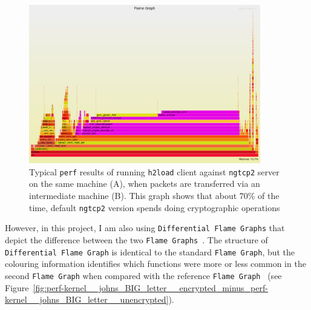 \documentclass[12pt,a4paper,twoside,openright]{report}
\begin{document}
    \begin{figure}[H]
    \centering
    \includegraphics[width=0.9\textwidth]{figs/perf_results_of_h2load.png}
    \caption[Typical \texttt{perf} results of running \texttt{h2load} client against \texttt{ngtcp2} server on the same machine (A), when packets are transferred via an intermediate machine (B)]{Typical \texttt{perf} results of running \texttt{h2load} client against \texttt{ngtcp2} server on the same machine (A), when packets are transferred via an intermediate machine (B). This graph shows that about 70\% of the time, default \texttt{ngtcp2} version spends doing cryptographic operations} 
    \label{fig:perf_results_of_h2load}
    \end{figure}


However, in this project, I am also using \texttt{Differential Flame Graphs} that depict the difference between the two \texttt{Flame Graphs}~\cite{Differential_Flame_Graphs}.
The structure of \texttt{Differential Flame Graph} is identical to the standard \texttt{Flame Graph}, but the colouring information identifies which functions were more or less common in the second \texttt{Flame Graph} when compared with the reference \texttt{Flame Graph}~\cite{Differential_Flame_Graphs} (see Figure~\ref{fig:perf-kernel__johns_BIG_letter__encrypted_minus_perf-kernel__johns_BIG_letter__unencrypted}).
\end{document}
